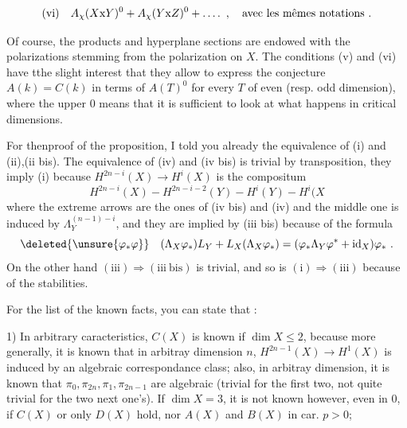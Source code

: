 
\[
\text{(vi)}\quad A_{\chi}(X\mathrm{x}Y)^0+A_{\chi}(Y\mathrm{x}Z)^0+\mathinner{\ldotp\ldotp\ldotp\ldotp}\ ,\quad\text{avec les mêmes notations .}
\]

Of course, the products and hyperplane sections are endowed with the polarizations stemming from the polarization on $X$. The conditions (v) and (vi) have tthe slight interest that they allow to express the conjecture $A(k)=C(k)$ in terms of $A(T)^0$ for every $T$ of even (resp. odd dimension), where the upper $0$ means that it is sufficient to look at what happens in critical dimensions.

For thenproof of the proposition, I told you already the equivalence of (i) and (ii),(ii bis). The equivalence of (iv) and (iv bis) is trivial by transposition, they  imply (i) because $H^{2n-i}(X)\to H^i(X)$ is the compositum
\[
H^{2n-i}(X)\mathbin{-}H^{2n-i-2}(Y)\mathbin{-}H^i(Y)\mathbin{-}H^i(X
\]
where the extreme arrows are the ones of (iv bis) and (iv) and the middle one is induced by $\Lambda_Y^{(n-1)-i}$, and they are implied by (iii bis) because of the formula
\[
\deleted{\unsure{\varphi_*\varphi}}\quad(\Lambda_X\varphi_*)L_Y+L_X(\Lambda_X\varphi_*)=(\varphi_*\Lambda_Y\varphi^*+\operatorname{id}_X)\varphi_*\ .
\]
On the other hand $(\mathrm{iii})\Rightarrow(\mathrm{iii\ bis})$ is trivial, and so is $(\mathrm{i})\Longrightarrow(\mathrm{iii})$ because of the stabilities.

For the list of the known facts, you can state that :

1) In arbitrary caracteristics, $C(X)$ is known if $\dim X\leq2$, because more generally, it is known that in arbitray dimension $n$, $H^{2n-1}(X)\to H^1(X)$ is induced by an algebraic correspondance class; also, in arbitray dimension, it is known that $\pi_0,\pi_{2n},\pi_1,\pi_{2n-1}$ are algebraic (trivial for the first two, not quite trivial for the two next one's). If $\dim X=3$, it is not known however, even in  $0$, if $C(X)$ or only $D(X)$ hold, nor $A(X)$ and $B(X)$ in car. $p>0$;

